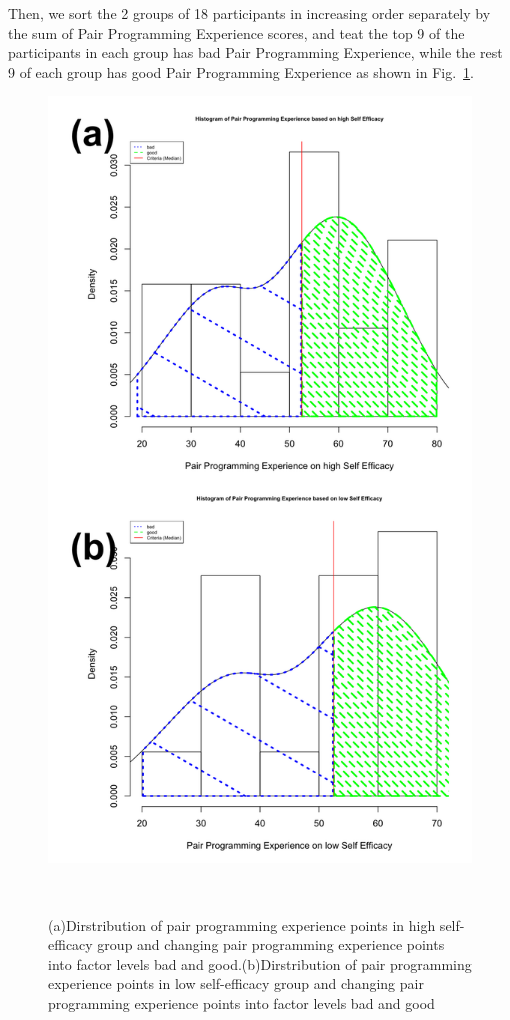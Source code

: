 \documentclass{sigchi}
\begin{document}
Then, we sort the 2 groups of 18 participants in increasing order separately by the sum of Pair Programming Experience scores, and teat the top 9 of the participants in each group has bad Pair Programming Experience, while the rest 9 of each group has good Pair Programming Experience as shown in Fig.~\ref{fig:figure2}. 

\begin{figure}
\centering
  \includegraphics[width=0.8\columnwidth]{figures/hist2}
  \caption{(a)Dirstribution of pair programming experience points in high self-efficacy group and changing pair programming experience points  into  factor levels bad and good.(b)Dirstribution of pair programming experience points in low self-efficacy group and changing pair programming experience points  into  factor levels bad and good }~\label{fig:figure2}
\end{figure}
\end{document}
